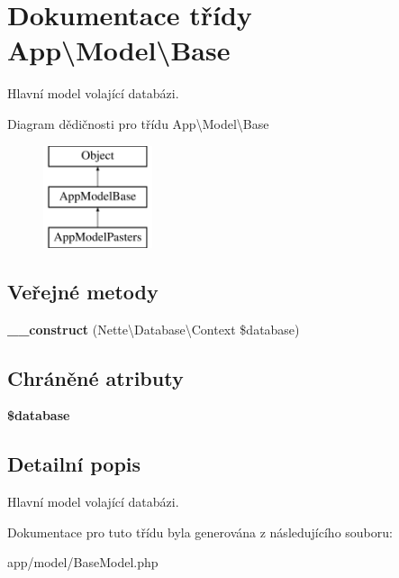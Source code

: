 \hypertarget{classApp_1_1Model_1_1Base}{\section{Dokumentace třídy App\textbackslash{}Model\textbackslash{}Base}
\label{classApp_1_1Model_1_1Base}
}


Hlavní model volající databázi.  


Diagram dědičnosti pro třídu App\textbackslash{}Model\textbackslash{}Base\begin{figure}[H]
\begin{center}
\leavevmode
\includegraphics[height=3.000000cm]{classApp_1_1Model_1_1Base}
\end{center}
\end{figure}
\subsection*{Veřejné metody}
\begin{DoxyCompactItemize}
\item 
\hypertarget{classApp_1_1Model_1_1Base_a9cdb951ad2ab48fb8661f8db19527596}{{\bfseries \-\_\-\-\_\-construct} (Nette\textbackslash{}\-Database\textbackslash{}\-Context \$database)}\label{classApp_1_1Model_1_1Base_a9cdb951ad2ab48fb8661f8db19527596}

\end{DoxyCompactItemize}
\subsection*{Chráněné atributy}
\begin{DoxyCompactItemize}
\item 
\hypertarget{classApp_1_1Model_1_1Base_af3c545dcc02fdfc450ec0a20a24148d5}{{\bfseries \$database}}\label{classApp_1_1Model_1_1Base_af3c545dcc02fdfc450ec0a20a24148d5}

\end{DoxyCompactItemize}


\subsection{Detailní popis}
Hlavní model volající databázi. 

Dokumentace pro tuto třídu byla generována z následujícího souboru\-:\begin{DoxyCompactItemize}
\item 
app/model/Base\-Model.\-php\end{DoxyCompactItemize}
